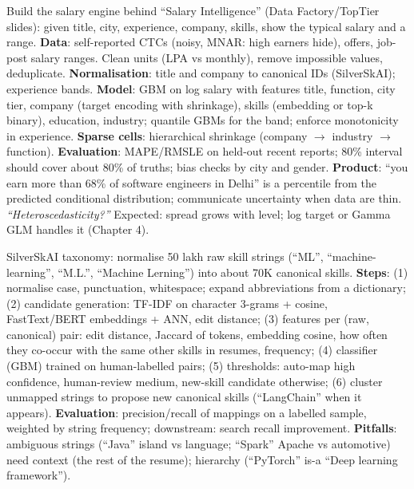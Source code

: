 \begin{qa}{\deep Build the salary engine behind ``Salary Intelligence'' (Data Factory/TopTier slides): given title, city, experience, company, skills, show the typical salary and a range.}
\why
\textbf{Data}: self-reported CTCs (noisy, MNAR: high earners hide), offers, job-post salary ranges. Clean units (LPA vs monthly), remove impossible values, deduplicate.
\textbf{Normalisation}: title and company to canonical IDs (SilverSkAI); experience bands.
\textbf{Model}: GBM on log salary with features title, function, city tier, company (target encoding with shrinkage), skills (embedding or top-k binary), education, industry; quantile GBMs
for the band; enforce monotonicity in experience.
\textbf{Sparse cells}: hierarchical shrinkage (company $\to$ industry $\to$ function).
\textbf{Evaluation}: MAPE/RMSLE on held-out recent reports; 80\% interval should cover about 80\% of truths; bias checks by city and gender.
\textbf{Product}: ``you earn more than 68\% of software engineers in Delhi'' is a percentile from the predicted conditional distribution; communicate uncertainty when data are thin.
\pushes \emph{``Heteroscedasticity?''} Expected: spread grows with level; log target or Gamma GLM handles it (Chapter 4).
\end{qa}

\begin{qa}{\deep SilverSkAI taxonomy: normalise 50 lakh raw skill strings (``ML'', ``machine-learning'', ``M.L.'', ``Machine Lerning'') into about 70K canonical skills.}
\why
\textbf{Steps}: (1) normalise case, punctuation, whitespace; expand abbreviations from a dictionary; (2) candidate generation: TF-IDF on character 3-grams + cosine, FastText/BERT embeddings + ANN,
edit distance; (3) features per (raw, canonical) pair: edit distance, Jaccard of tokens, embedding cosine, how often they co-occur with the same other skills in resumes, frequency;
(4) classifier (GBM) trained on human-labelled pairs; (5) thresholds: auto-map high confidence, human-review medium, new-skill candidate otherwise; (6) cluster unmapped strings to propose new
canonical skills (``LangChain'' when it appears).
\textbf{Evaluation}: precision/recall of mappings on a labelled sample, weighted by string frequency; downstream: search recall improvement.
\textbf{Pitfalls}: ambiguous strings (``Java'' island vs language; ``Spark'' Apache vs automotive) need context (the rest of the resume); hierarchy (``PyTorch'' is-a ``Deep learning
framework'').
\end{qa}

